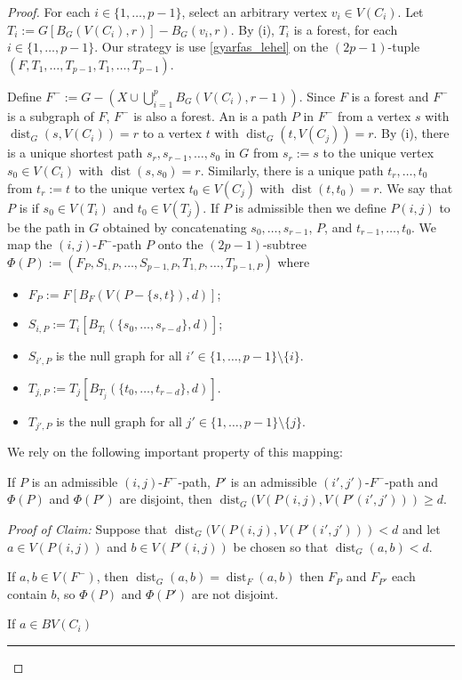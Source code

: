 \documentclass{patmorin}
\newenvironment{clmproof}{\noindent\emph{Proof of Claim:}}{\hfill\rule{1ex}{1ex}\newline}
\DeclareMathOperator{\dist}{dist}
\begin{document}
\begin{proof}
  For each $i\in\{1,\ldots,p-1\}$, select an arbitrary vertex $v_i\in V(C_i)$.  Let $T_i:=G[B_G(V(C_i),r)]-B_G(v_i,r)$.  By (i), $T_i$ is a forest, for each $i\in\{1,\ldots,p-1\}$.
  Our strategy is use \cref{gyarfas_lehel} on the $(2p-1)$-tuple $(F,T_1,\ldots,T_{p-1},T_1,\ldots,T_{p-1})$.

  Define $F^-:=G-(X\cup \bigcup_{i=1}^p B_G(V(C_i),r-1))$.  Since $F$ is a forest and $F^-$ is a subgraph of $F$, $F^-$ is also a forest.
  An  is a path $P$ in $F^-$ from a vertex $s$ with  $\dist_G(s,V(C_i))=r$ to a vertex $t$ with $\dist_G(t,V(C_j))=r$.  By (i), there is a unique shortest path $s_r,s_{r-1},\ldots,s_0$ in $G$ from $s_r:=s$ to the unique vertex $s_0\in V(C_i)$ with $\dist(s,s_0)=r$.  Similarly, there is a unique path $t_r,\ldots,t_0$ from $t_r:=t$ to the unique vertex $t_0\in V(C_j)$ with $\dist(t,t_0)=r$.  We say that $P$ is  if $s_0\in V(T_i)$ and $t_0\in V(T_j)$. If $P$ is admissible then we define $P(i,j)$ to be the path in $G$ obtained by concatenating $s_0,\ldots,s_{r-1}$, $P$, and $t_{r-1},\ldots,t_0$.  We map the $(i,j)$-$F^-$-path $P$ onto the $(2p-1)$-subtree $\Phi(P):=(F_P, S_{1,P},\ldots,S_{p-1,P},T_{1,P},\ldots,T_{p-1,P})$ where
  \begin{itemize}
    \item $F_P:= F[B_F(V(P-\{s,t\}),d)]$;
    \item $S_{i,P}:=T_i[B_{T_i}(\{s_0,\ldots,s_{r-d}\},d)]$;
    \item $S_{i',P}$ is the null graph for all $i'\in\{1,\ldots,p-1\}\setminus\{i\}$.
    \item $T_{j,P}:=T_j[B_{T_j}(\{t_0,\ldots,t_{r-d}\},d)]$.
    \item $T_{j',P}$ is the null graph for all $j'\in\{1,\ldots,p-1\}\setminus\{j\}$.
  \end{itemize}
  We rely on the following important property of this mapping:
  \begin{clm}
    If $P$ is an admissible $(i,j)$-$F^-$-path, $P'$ is an admissible $(i',j')$-$F^-$-path and $\Phi(P)$ and $\Phi(P')$ are disjoint, then $\dist_G(V(P(i,j),V(P'(i',j')))\ge d$.
  \end{clm}
  \begin{clmproof}
     Suppose that $\dist_G(V(P(i,j),V(P'(i',j')))< d$ and let $a\in V(P(i,j))$ and $b\in V(P'(i,j))$ be chosen so that $\dist_G(a,b)<d$.
     \begin{compactitem}
       \item If $a,b\in V(F^-)$, then $\dist_G(a,b)=\dist_F(a,b)$ then $F_P$ and $F_{P'}$ each contain $b$, so $\Phi(P)$ and $\Phi(P')$ are not disjoint.
       \item If $a\in BV(C_i)$
     \end{compactitem}
  \end{clmproof}
  [Continue]
\end{proof}
\end{document}
